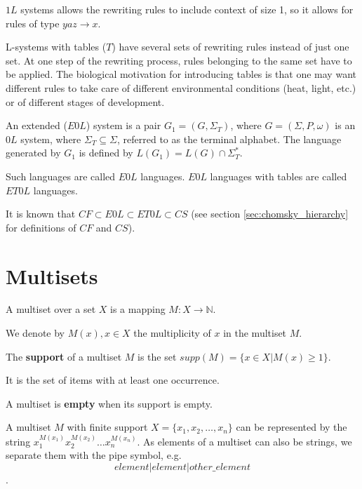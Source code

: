 $1L$ systems allows the rewriting rules to include context of size 1, so it allows for rules of type $yaz\rightarrow x$.

L-systems with tables ($T$) have several sets of rewriting rules instead of just one set. At one step of the rewriting process, rules belonging to the same set have to be applied. The biological motivation for introducing tables is that one may want different rules to take care of different environmental conditions (heat, light, etc.) or of different stages of development.

\begin{definition}
An extended ($E0L$) system is a pair $G_1 = (G, \Sigma_T)$, where $G = (\Sigma, P, \omega)$ is an $0L$ system, where $\Sigma_T \subseteq \Sigma$, referred to as the terminal alphabet. The language generated by $G_1$ is defined by $L(G_1) = L(G)\cap \Sigma_T^*$.
\end{definition}

Such languages are called $E0L$ languages. $E0L$ languages with tables are called $ET0L$ languages.

It is known that $CF \subset E0L \subset ET0L \subset CS$ (see section \ref{sec:chomsky_hierarchy} for definitions of $CF$ and $CS$).

\section{Multisets} %
\label{sec:multisets}

\begin{definition}
A multiset over a set $X$ is a mapping $M: X\rightarrow \mathbb N$.
\end{definition}

We denote by $M(x), x\in X$ the multiplicity of $x$ in the multiset $M$.

\begin{definition}
The {\bf support} of a multiset $M$ is the set $supp(M)=\{x\in X|M(x)\geq 1\}$.
\end{definition}

It is the set of items with at least one occurrence.

\begin{definition}
A multiset is {\bf empty} when its support is empty.
\end{definition}

A multiset $M$ with finite support $X = \{x_1, x_2, \ldots, x_n\}$ can be represented by the string $x_1^{M(x_1)}x_2^{M(x_2)}\ldots x_n^{M(x_n)}$.
As elements of a multiset can also be strings, we separate them with the pipe symbol, e.g. $$element|element|other\_element$$.

